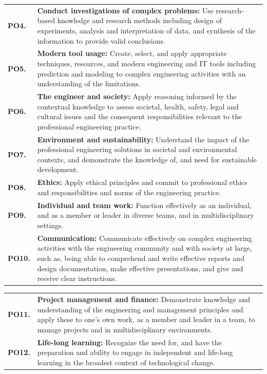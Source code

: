 \thispagestyle{empty}
\begin{table}[H]
  \centering
  \fontsize{13pt}{17pt}\selectfont
  \begin{tabularx}{\textwidth}{@{}p{1.8cm} L@{}}
    \textbf{PO4.} & \textbf{Conduct investigations of complex problems:} Use research-based knowledge and research methods including design of experiments, analysis and interpretation of data, and synthesis of the information to provide valid conclusions. \\[5pt]
    \textbf{PO5.} & \textbf{Modern tool usage:} Create, select, and apply appropriate techniques, resources, and modern engineering and IT tools including prediction and modeling to complex engineering activities with an understanding of the limitations. \\[5pt]
    \textbf{PO6.} & \textbf{The engineer and society:} Apply reasoning informed by the contextual knowledge to assess societal, health, safety, legal and cultural issues and the consequent responsibilities relevant to the professional engineering practice. \\[5pt]
    \textbf{PO7.} & \textbf{Environment and sustainability:} Understand the impact of the professional engineering solutions in societal and environmental contexts, and demonstrate the knowledge of, and need for sustainable development. \\[5pt]
    \textbf{PO8.} & \textbf{Ethics:} Apply ethical principles and commit to professional ethics and responsibilities and norms of the engineering practice. \\[5pt]
    \textbf{PO9.} & \textbf{Individual and team work:} Function effectively as an individual, and as a member or leader in diverse teams, and in multidisciplinary settings. \\[5pt]
    \textbf{PO10.} & \textbf{Communication:} Communicate effectively on complex engineering activities with the engineering community and with society at large, such as, being able to comprehend and write effective reports and design documentation, make effective presentations, and give and receive clear instructions.
  \end{tabularx}
\end{table}
\newpage

\thispagestyle{empty}
\begin{table}[H]
  \centering
  \fontsize{13pt}{18pt}\selectfont
  \begin{tabularx}{\textwidth}{@{}p{1.8cm} L@{}}
    \textbf{PO11.} & \textbf{Project management and finance:} Demonstrate knowledge and understanding of the engineering and management principles and apply these to one's own work, as a member and leader in a team, to manage projects and in multidisciplinary environments. \\[8pt]
    \textbf{PO12.} & \textbf{Life-long learning:} Recognize the need for, and have the preparation and ability to engage in independent and life-long learning in the broadest context of technological change.
  \end{tabularx}
\end{table}

